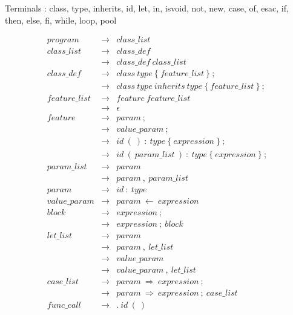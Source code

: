 \documentclass{article}
\begin{document}
	Terminals : class, type, inherits, id, let, in, isvoid, not, new, case, of, esac, if, then, else, fi, while, loop, pool 

\begin{eqnarray*}
	program          & \rightarrow & class\_list \\
	class\_list      & \rightarrow & class\_def \\
	                 & \rightarrow & class\_def \ class\_list \\
	class\_def       & \rightarrow & class \ type \ \{ \ feature\_list\ \} \ ;\\
	                 & \rightarrow & class \ type \ inherits \ type \ \{ \ feature\_list\ \} \ ;\\
	feature\_list    & \rightarrow & feature \ feature\_list \\
	                 & \rightarrow & \epsilon \\
	feature          & \rightarrow & param \ ; \\	 
	                 & \rightarrow & value\_param \ ;\\
	                 & \rightarrow & id \ ( \ ) \ : \ type \ \{ \ expression \ \} \ ; \\
	                 & \rightarrow & id \ ( \ param\_list \ ) \ : \ type\ \{ \ expression \ \} \ ; \\
	param\_list      & \rightarrow & param \\
	                 & \rightarrow & param \ , \ param\_list \\
	param            & \rightarrow & id \ : \ type \\
	value\_param     & \rightarrow & param \ \leftarrow \ expression \\
	block            & \rightarrow & expression \ ; \\
	                 & \rightarrow & expression \ ; \ block\\
	let\_list        & \rightarrow & param\\
	                 & \rightarrow & param \ , \ let\_list\\
                     & \rightarrow & value\_param\\
                     & \rightarrow & value\_param \ , \ let\_list\\
    case\_list       & \rightarrow & param \ \Rightarrow \ expression \ ; \\
	                 & \rightarrow & param \ \Rightarrow \ expression \ ; \ case\_list\\
	func\_call       & \rightarrow & . \ id \ ( \ )\\

\end{eqnarray*}
\end{document}
